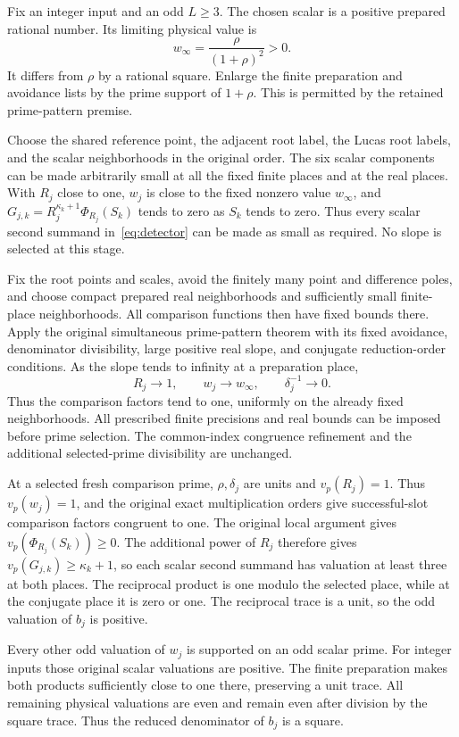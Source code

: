 \documentclass[11pt,a4paper]{article}
\begin{document}
Fix an integer input and an odd $L\ge3$. The chosen scalar is a
positive prepared rational number. Its limiting physical value is
\[
                         w_\infty=\frac{\rho}{(1+\rho)^2}>0.
\]
It differs from $\rho$ by a rational square. Enlarge the finite
preparation and avoidance lists by the prime support of $1+\rho$.
This is permitted by the retained prime-pattern premise.

Choose the shared reference point, the adjacent root label, the Lucas
root labels, and the scalar neighborhoods in the original order.
The six scalar components can be made arbitrarily small at all the
fixed finite places and at the real places. With $R_j$ close to one,
$w_j$ is close to the fixed nonzero value $w_\infty$, and
$G_{j,k}=R_j^{\kappa_k+1}\Phi_{R_j}(S_k)$ tends to zero
as $S_k$ tends to zero. Thus every scalar
second summand in~\eqref{eq:detector} can be made as small as required.
No slope is selected at this stage.

Fix the root points and scales, avoid the finitely many point and
difference poles, and choose compact prepared real neighborhoods and
sufficiently small finite-place neighborhoods. All comparison
functions then have fixed bounds there. Apply the original simultaneous
prime-pattern theorem with its fixed avoidance, denominator divisibility,
large positive real slope, and conjugate reduction-order conditions.
As the slope tends to infinity at a preparation place,
\[
                     R_j\longrightarrow1,\qquad
                     w_j\longrightarrow w_\infty,
                     \qquad\delta_j^{-1}\longrightarrow0.
\]
Thus the comparison factors tend to one, uniformly on the already fixed
neighborhoods. All prescribed finite precisions and real bounds can be
imposed before prime selection. The common-index congruence refinement
and the additional selected-prime divisibility are unchanged.

At a selected fresh comparison prime, $\rho,\delta_j$ are units and
$v_p(R_j)=1$. Thus $v_p(w_j)=1$, and the original exact multiplication
orders give successful-slot comparison factors congruent to one.
The original local argument gives $v_p(\Phi_{R_j}(S_k))\ge0$.
The additional power of $R_j$ therefore gives
$v_p(G_{j,k})\ge\kappa_k+1$, so each scalar second summand
has valuation at least three at both places. The reciprocal product is
one modulo the selected place, while at the conjugate place it is
zero or one. The reciprocal trace is a unit, so the odd valuation
of $b_j$ is positive.

Every other odd valuation of $w_j$ is supported on an odd scalar prime.
For integer inputs those original scalar valuations are positive.
The finite preparation makes both products sufficiently close to one
there, preserving a unit trace. All remaining physical valuations are
even and remain even after division by the square trace. Thus the
reduced denominator of $b_j$ is a square.
\end{document}

